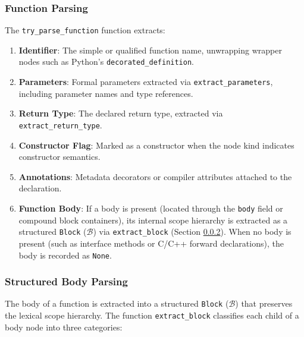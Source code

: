 \subsubsection{Function Parsing}

The \texttt{try\_parse\_function} function extracts:
\begin{enumerate}
  \item \textbf{Identifier}: The simple or qualified function name,
    unwrapping wrapper nodes such as Python's \texttt{decorated\_definition}.
  \item \textbf{Parameters}: Formal parameters extracted via
    \texttt{extract\_parameters}, including parameter names and type references.
  \item \textbf{Return Type}: The declared return type, extracted via
    \texttt{extract\_ret}\-\texttt{urn\_type}.
  \item \textbf{Constructor Flag}: Marked as a constructor when the node kind
    indicates constructor semantics.
  \item \textbf{Annotations}: Metadata decorators or compiler attributes
    attached to the declaration.
  \item \textbf{Function Body}: If a body is present (located through the
    \texttt{body} field or compound block containers), its internal scope
    hierarchy is extracted as a structured \texttt{Block} ($\mathcal{B}$)
    via \texttt{extract\_block} (Section \ref{sec:body_parsing}).
    When no body is present (such as interface methods or C/C++ forward
    declarations), the body is recorded as \texttt{None}.
\end{enumerate}

\subsubsection{Structured Body Parsing}
\label{sec:body_parsing}
\label{sec:body_extraction}

The body of a function is extracted into a structured \texttt{Block}
($\mathcal{B}$) that preserves the lexical scope hierarchy. The
function \texttt{extract\_block} classifies each child of a body node
into three categories:

